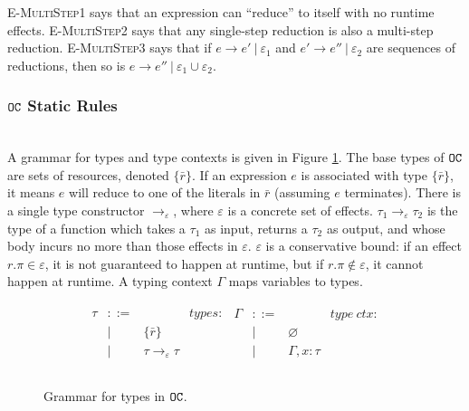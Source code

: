 \textsc{E-MultiStep1} says that an expression can ``reduce'' to itself with no runtime effects. \textsc{E-MultiStep2} says that any single-step reduction is also a multi-step reduction. \textsc{E-MultiStep3} says that if $e \longrightarrow e'~|~\varepsilon_1$ and $e' \longrightarrow e''~|~\varepsilon_2$ are sequences of reductions, then so is $e \longrightarrow e''~|~\varepsilon_1 \cup \varepsilon_2$. \\

\subsubsection{$\mathtt{OC}$ Static Rules}~\\

A grammar for types and type contexts is given in Figure \ref{fig:opercalc_types}. The base types of $\mathtt{OC}$ are sets of resources, denoted $\{ \bar r\}$. If an expression $e$ is associated with type $\{ \bar r \}$, it means $e$ will reduce to one of the literals in $\bar r$ (assuming $e$ terminates). There is a single type constructor $\rightarrow_{\varepsilon}$, where $\varepsilon$ is a concrete set of effects. $\tau_1 \rightarrow_{\varepsilon} \tau_2$ is the type of a function which takes a $\tau_1$ as input, returns a $\tau_2$ as output, and whose body incurs no more than those effects in $\varepsilon$. $\varepsilon$ is a conservative bound: if an effect $r.\pi \in \varepsilon$, it is not guaranteed to happen at runtime, but if $r.\pi \notin \varepsilon$, it cannot happen at runtime. A typing context $\Gamma$ maps variables to types. 

\begin{figure}[h]
\vspace{-5pt}

\[
\begin{array}{lll}

\begin{array}{lllr}

\tau & ::= & ~ & types: \\
		& | & \{ \bar r \} \\
		& | & \tau \rightarrow_{\varepsilon} \tau \\ 
		&&\\
\end{array}

\begin{array}{lllr}

\Gamma & ::= & ~ & type~ctx: \\
				& | & \varnothing \\
				& | & \Gamma, x: \tau \\
				&&\\
\end{array}

\end{array}
\]

\vspace{-7pt}
\caption{Grammar for types in $\mathtt{OC}$.}
\label{fig:opercalc_types}
\end{figure}

